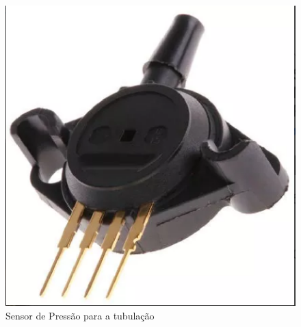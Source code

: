 \begin{figure}[!htb]                   
	\centering                          
	\includegraphics[scale=0.5]{figuras/Figura_5.eps}
	\caption{Sensor de Pressão para a tubulação}               
\end{figure}
